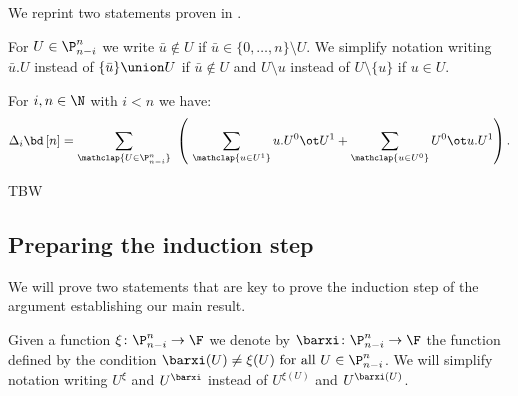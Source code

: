 We reprint two statements proven in \cite{medina2023fast_sq}.

\begin{notation*}
	For $U \in \P_{n-i}^n$ we write $\bar u \notin U$ if $\bar u \in \{0, \dots, n\} \setminus U$.
	We simplify notation writing $\bar u.U$ instead of $\{\bar u\} \union U$ if $\bar u \notin U$ and $U \setminus u$ instead of $U \setminus \{u\}$ if $u \in U$.
\end{notation*}

\begin{proposition}\label{p:fact1}
	For $i,n \in \N$ with $i < n$ we have:
	\[
	\Delta_i \bd \, [n] =
	\sum_{\mathclap{U \in \P_{n-i}^n}} \
	\left(\
	\sum_{\mathclap{u \in U^1}} u.U^0 \ot U^1 +
	\sum_{\mathclap{u \in U^0}} U^0 \ot u.U^1
	\right).
	\]
\end{proposition}

\begin{proposition}\label{p:fact2}
	TBW
\end{proposition}

\subsection{Preparing the induction step}\label{ss:preparing}

We will prove two statements that are key to prove the induction step of the argument establishing our main result.

\begin{notation*}
	Given a function $\xi \colon \P_{n-i}^n \to \F$ we denote by $\barxi \colon \P_{n-i}^n \to \F$ the function defined by the condition $\barxi(U) \neq \xi(U) \text{ for all } U \in \P_{n-i}^n$.
	We will simplify notation writing $U^\xi$ and $U^{\barxi}$ instead of $U^{\xi(U)}$ and $U^{\barxi(U)}$.
\end{notation*}

